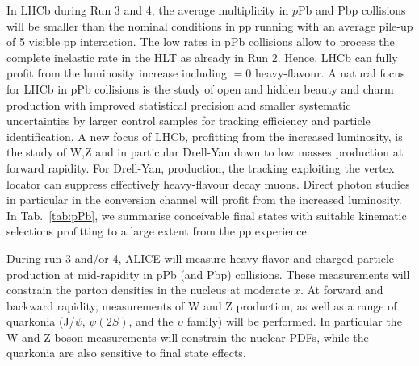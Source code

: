 \documentclass[../report.tex]{subfiles}
\begin{document}
In LHCb during Run 3 and 4, the average multiplicity in $p$Pb and Pbp collisions will be smaller than the nominal conditions in pp running with an average  pile-up of 5 visible pp interaction. The low rates in pPb collisions allow to process the complete inelastic rate in the HLT as already in Run 2. Hence, LHCb can fully profit from the luminosity increase including \pT$=0$ heavy-flavour.  A natural focus for LHCb in pPb collisions is the study of open and hidden beauty and charm production with improved statistical precision and smaller systematic uncertainties by larger control samples for tracking efficiency and particle identification. A new focus of LHCb, profitting from the increased luminosity, is the study of W,Z and in particular Drell-Yan down to low masses production at forward rapidity. For Drell-Yan, production, the tracking exploiting the vertex locator can suppress effectively heavy-flavour decay muons. Direct photon studies in particular in the conversion channel will profit from the increased luminosity. In Tab.~\ref{tab:pPb}, we summarise conceivable final states with suitable kinematic selections profitting to a large extent from the pp experience.

During run 3 and/or 4, ALICE will measure heavy flavor and charged particle production at mid-rapidity in pPb (and Pbp) collisions. These measurements will constrain the parton densities in the nucleus at moderate $x$. At forward and backward rapidity, measurements of W and Z production, as well as a range of quarkonia (J/$\psi$, $\psi(2S)$, and the $\upsilon$ family) will be performed. In particular the W and Z boson measurements will constrain the nuclear PDFs, while the quarkonia are also sensitive to final state effects.
\end{document}
